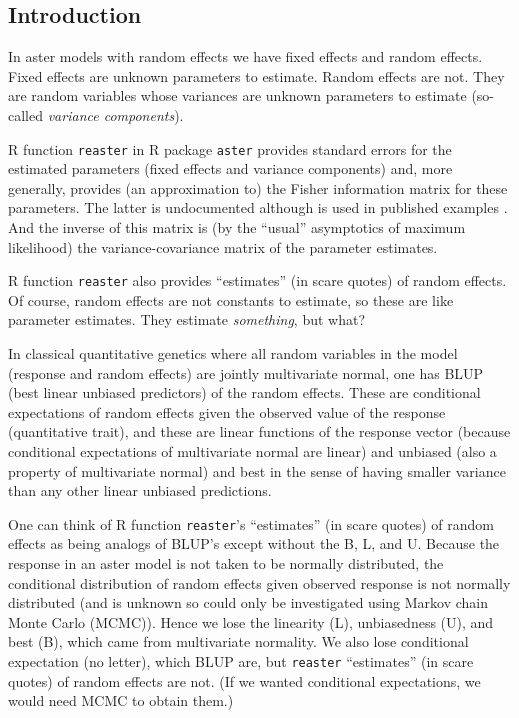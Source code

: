 \documentclass[11pt]{article}
\let\code=\texttt
\begin{document}
\subsection{Introduction}

In aster models with random effects \citep*{reaster} we have fixed effects
and random effects.  Fixed effects are unknown parameters to estimate.
Random effects are not.  They are random variables whose variances are
unknown parameters to estimate (so-called \emph{variance components}).

R function \code{reaster} in R package \code{aster} \citep{aster-package}
provides standard errors for the estimated parameters (fixed effects and
variance components) and, more generally, provides (an approximation to)
the Fisher information matrix for these parameters.  The latter is
undocumented although is used in published examples
\citep[Supplementary material Section~12.3.1]{zenodo}.  And the inverse
of this matrix is (by the ``usual'' asymptotics of maximum likelihood)
the variance-covariance matrix of the parameter estimates.

R function \code{reaster} also provides ``estimates'' (in scare quotes)
of random effects.  Of course, random effects are not constants to estimate,
so these are like parameter estimates.  They estimate \emph{something}, but
what?

In classical quantitative genetics where all random variables in the model
(response and random effects) are jointly multivariate normal, one has
BLUP (best linear unbiased predictors) of the random effects.  These
are conditional expectations of random effects given the observed value
of the response (quantitative trait), and these are linear functions
of the response vector (because conditional expectations of multivariate
normal are linear) and unbiased (also a property of multivariate normal)
and best in the sense of having smaller variance than any other linear
unbiased predictions.

One can think of R function \code{reaster}'s ``estimates'' (in scare quotes)
of random effects as being analogs of BLUP's except without the B, L, and U.
Because the response in an aster model is not taken to be normally distributed,
the conditional distribution of random effects given observed response is
not normally distributed (and is unknown so could only be investigated
using Markov chain Monte Carlo (MCMC)).  Hence we lose the linearity (L),
unbiasedness (U), and best (B), which came from multivariate normality.
We also lose conditional expectation (no letter), which BLUP are,
but \code{reaster} ``estimates'' (in scare quotes) of random effects are not.
(If we wanted conditional expectations, we would need MCMC to obtain them.)
\end{document}
